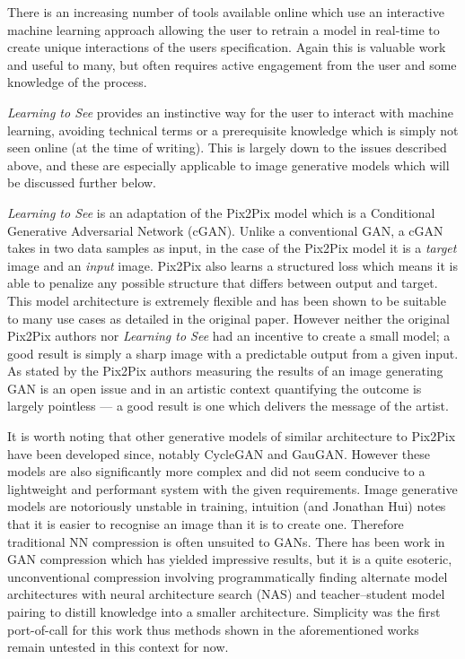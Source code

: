 \documentclass{article}
\begin{document}
There is an increasing number of tools available online which use an interactive machine learning approach allowing the user to retrain a model in real-time to create unique interactions of the users specification\cite{magenta, mimic, teachablemachines}. Again this is valuable work and useful to many, but often requires active engagement from the user and some knowledge of the process.

\textit{Learning to See} provides an instinctive way for the user to interact with machine learning, avoiding technical terms or a prerequisite knowledge which is simply not seen online (at the time of writing). This is largely down to the issues described above, and these are especially applicable to image generative models which will be discussed further below.

\textit{Learning to See} is an adaptation of the Pix2Pix model\cite{1611.07004} which is a Conditional Generative Adversarial Network (cGAN)\cite{1701.00160}. Unlike a conventional GAN\cite{1406.2661}, a cGAN takes in two data samples as input, in the case of the Pix2Pix model it is a \textit{target} image and an \textit{input} image. Pix2Pix also learns a structured loss which means it is able to penalize any possible structure that differs between output and target\cite{1611.07004}. This model architecture is extremely flexible and has been shown to be suitable to many use cases as detailed in the original paper. However neither the original Pix2Pix authors nor \textit{Learning to See} had an incentive to create a small model; a good result is simply a sharp image with a predictable output from a given input. As stated by the Pix2Pix authors measuring the results of an image generating GAN is an open issue\cite{1606.03498, 1611.07004} and in an artistic context quantifying the outcome is largely pointless --- a good result is one which delivers the message of the artist.


It is worth noting that other generative models of similar architecture to Pix2Pix have been developed since, notably CycleGAN\cite{1703.10593} and GauGAN\cite{1903.07291}. However these models are also significantly more complex and did not seem conducive to a lightweight and performant system with the given requirements. Image generative models are notoriously unstable in training, intuition (and Jonathan Hui) notes that it is easier to recognise an image than it is to create one\cite{hard_to_train_gans}. Therefore traditional NN compression\cite{2006.03669} is often unsuited to GANs. There has been work in GAN compression which has yielded impressive results, but it is a quite esoteric, unconventional compression involving programmatically finding alternate model architectures with neural architecture search (NAS) and teacher--student model pairing to distill knowledge into a smaller architecture\cite{2003.08936}. Simplicity was the first port-of-call for this work thus methods shown in the aforementioned works remain untested in this context for now.
\end{document}

